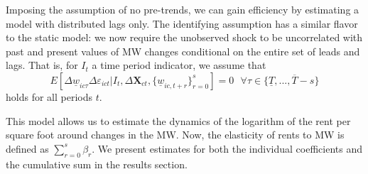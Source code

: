 Imposing the assumption of no pre-trends, we can gain efficiency by estimating a model with 
distributed lags only. %
The identifying assumption has a similar flavor to the static model: we now require the 
unobserved shock to be uncorrelated with past and present values of MW changes conditional 
on the entire set of leads and lags. That is, for $I_t$ a time period indicator, we assume 
that
\begin{equation*}\label{eq:identifying-lags}
	E\left[\Delta \underline{w}_{ic \tau} \Delta \varepsilon_{ict} | 
			I_t, \Delta \mathbf{X}_{ct}, \{\underline{w}_{ic,t+r}\}_{r=0}^s \right] = 0
	\ \ \ \forall \tau \in \{\underline{T}, ..., \overline{T} - s\} 
\end{equation*}
holds for all periods $t$.


This model allows us to estimate the dynamics of the logarithm of the rent per square foot 
around changes in the MW. Now, the elasticity of rents to MW is defined as $\sum_{r=0}^s 
\beta_r$. We present estimates for both the individual coefficients and the cumulative sum 
in the results section. 



